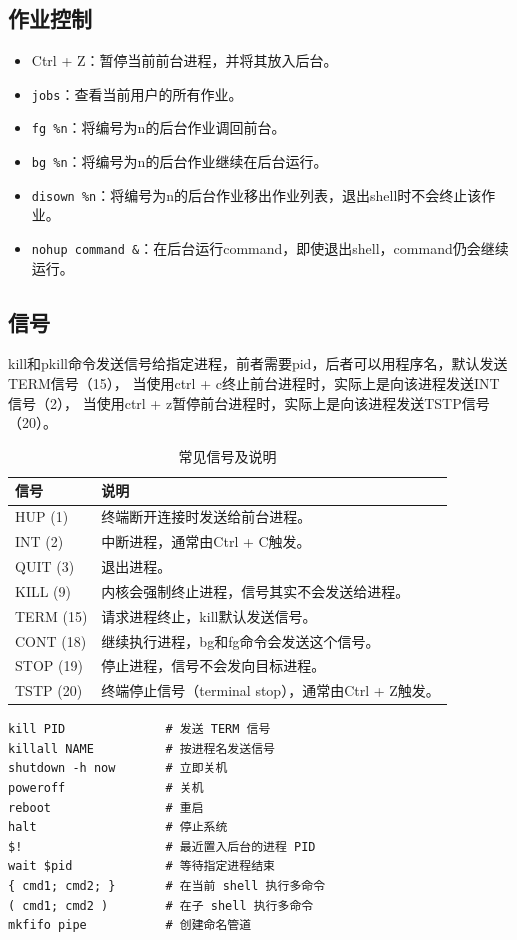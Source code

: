 \subsection{作业控制}
\begin{itemize}
	\item Ctrl + Z：暂停当前前台进程，并将其放入后台。
	\item \verb|jobs|：查看当前用户的所有作业。
	\item \verb|fg %n|：将编号为n的后台作业调回前台。
	\item \verb|bg %n|：将编号为n的后台作业继续在后台运行。
	\item \verb|disown %n|：将编号为n的后台作业移出作业列表，退出shell时不会终止该作业。
	\item \verb|nohup command &|：在后台运行command，即使退出shell，command仍会继续运行。
\end{itemize}

\subsection{信号}
kill和pkill命令发送信号给指定进程，前者需要pid，后者可以用程序名，默认发送TERM信号（15），
当使用ctrl + c终止前台进程时，实际上是向该进程发送INT信号（2），
当使用ctrl + z暂停前台进程时，实际上是向该进程发送TSTP信号（20）。
\begin{table}[H]
	\centering
	\begin{tabular}{|l|l|}
		\hline
		\textbf{信号} & \textbf{说明}                          \\
		\hline
		HUP (1)     & 终端断开连接时发送给前台进程。                      \\
		\hline
		INT (2)     & 中断进程，通常由Ctrl + C触发。                  \\
		\hline
		QUIT (3)    & 退出进程。                                \\
		\hline
		KILL (9)    & 内核会强制终止进程，信号其实不会发送给进程。               \\
		\hline
		TERM (15)   & 请求进程终止，kill默认发送信号。                   \\
		\hline
		CONT (18)   & 继续执行进程，bg和fg命令会发送这个信号。               \\
		\hline
		STOP (19)   & 停止进程，信号不会发向目标进程。                     \\
		\hline
		TSTP (20)   & 终端停止信号（terminal stop），通常由Ctrl + Z触发。 \\
		\hline
	\end{tabular}
	\caption{常见信号及说明}
\end{table}

\begin{code}[title=进程控制]
	\begin{verbatim}
kill PID              # 发送 TERM 信号
killall NAME          # 按进程名发送信号
shutdown -h now       # 立即关机
poweroff              # 关机
reboot                # 重启
halt                  # 停止系统
$!                    # 最近置入后台的进程 PID
wait $pid             # 等待指定进程结束
{ cmd1; cmd2; }       # 在当前 shell 执行多命令
( cmd1; cmd2 )        # 在子 shell 执行多命令
mkfifo pipe           # 创建命名管道
	\end{verbatim}
\end{code}
